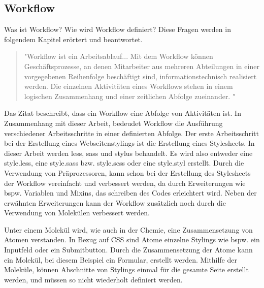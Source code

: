 \subsection{Workflow}
Was ist Workflow? Wie wird Workflow definiert?\newline
Diese Fragen werden in folgendem Kapitel erörtert und beantwortet.\newline
\begin{quote}
"Workflow ist ein Arbeitsablauf... Mit dem Workflow können Geschäftsprozesse, an denen Mitarbeiter aus mehreren Abteilungen in einer vorgegebenen Reihenfolge beschäftigt sind, informationstechnisch realisiert werden. Die einzelnen Aktivitäten eines Workflows stehen in einem logischen Zusammenhang und einer zeitlichen Abfolge zueinander. "
\autocite[]{ITWissen.info.2014}
\end{quote}
Das Zitat beschreibt, dass ein Workflow eine Abfolge von Aktivitäten ist. In Zusammenhang mit dieser Arbeit, bedeudet Workflow die Ausführung verschiedener Arbeitsschritte in einer definierten Abfolge.\newline
Der erste Arbeitsschritt bei der Erstellung eines Webseitenstylings ist die Erstellung eines Stylesheets. In dieser Arbeit werden less, sass und stylus behandelt. Es wird also entweder eine style.less, eine style.sass bzw. style.scss oder eine style.styl erstellt. \newline
Durch die Verwendung von Präprozessoren, kann schon bei der Erstellung des Stylesheets der Workflow vereinfacht und verbessert werden, da durch Erweiterungen wie bspw. Variablen und Mixins, das schreiben des Codes erleichtert wird.\newline
Neben der erwähnten Erweiterungen kann der Workflow zusätzlich noch durch die Verwendung von Molekülen verbessert werden.

Unter einem Molekül wird, wie auch in der Chemie, eine Zusammensetzung von Atomen verstanden. \newline
In Bezug auf CSS sind Atome einzelne Stylings wie bspw. ein Inputfeld oder ein Submitbutton. Durch die Zusammensetzung der Atome kann ein Molekül, bei diesem Beispiel ein Formular, erstellt werden.\autocite[]{Frost.2013}\newline
Mithilfe der Moleküle, können Abschnitte von Stylings einmal für die gesamte Seite erstellt werden, und müssen so nicht wiederholt definiert werden.

